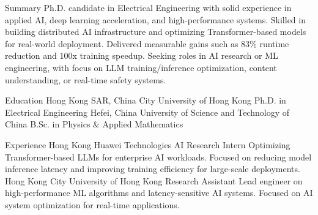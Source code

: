 \documentclass[caps, english]{financecv}
\begin{document}
\begin{cvsection}{Summary}
    Ph.D. candidate in Electrical Engineering with solid experience in applied AI, deep learning acceleration, and high-performance systems. Skilled in building distributed AI infrastructure and optimizing Transformer-based models for real-world deployment. Delivered measurable gains such as $83\%$ runtime reduction and $100$x training speedup. Seeking roles in AI research or ML engineering, with focus on LLM training/inference optimization, content understanding, or real-time safety systems.
\end{cvsection}

\begin{cvsection}{Education}
    {Hong Kong SAR, China}
    {City University of Hong Kong}
    {Ph.D. in Electrical Engineering}
    {}
    {}
    {}
    {}
    {Hefei, China}
    {University of Science and Technology of China}
    {B.Sc. in Physics \& Applied Mathematics}
    {}
    {}
    {}
    {}
\end{cvsection}

\begin{cvsection}{Experience}
    {Hong Kong}
    {Huawei Technologies}
    {AI Research Intern}
    {Optimizing Transformer-based LLMs for enterprise AI workloads. Focused on reducing model inference latency and improving training efficiency for large-scale deployments.}
    {}
    {}
    {}
    {Hong Kong}
    {City University of Hong Kong}
    {Research Assistant}
    {Lead engineer on high-performance ML algorithms and latency-sensitive AI systems. Focused on AI system optimization for real-time applications.}
    {}
    {}
    {}
\end{cvsection}
\end{document}
